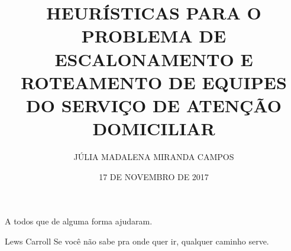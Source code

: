\documentclass[qual, classic, a4paper]{ufbathesis}
\institute{INSTITUTO DE MATEM\'{A}TICA}
\title{HEURÍSTICAS PARA O PROBLEMA DE  ESCALONAMENTO E ROTEAMENTO DE EQUIPES DO SERVIÇO DE ATEN\c{C}\~AO DOMICILIAR}
\date{17 DE NOVEMBRO DE 2017}
\author{JÚLIA MADALENA MIRANDA CAMPOS}
\begin{document}


\frontpage

\frontmatter

\presentationpage






\acknowledgements
A todos que de alguma forma ajudaram.

 \begin{epigraph}[]{Lews Carroll}
  Se voc\^{e} n\~{a}o sabe pra onde quer ir, qualquer caminho serve.
 \end{epigraph}






\listoffigures

\listoftables

\mainmatter
\end{document}
